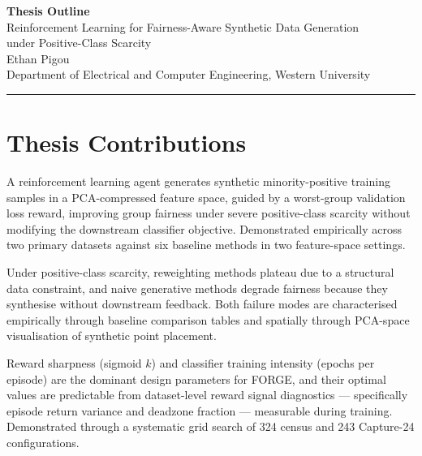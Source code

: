 \documentclass[12pt]{article}
\begin{document}
\begin{center}
    {\LARGE\bfseries Thesis Outline}\\[0.5em]
    {\large Reinforcement Learning for Fairness-Aware Synthetic Data Generation\\
    under Positive-Class Scarcity}\\[0.5em]
    {\normalsize Ethan Pigou\\
    Department of Electrical and Computer Engineering, Western University}
\end{center}

\vspace{1em}
\hrule
\vspace{1em}

\section*{Thesis Contributions}

\begin{description}[leftmargin=2.5cm, labelwidth=2cm]

    \item[\textbf{C1 --- FORGE method.}]
    A reinforcement learning agent generates synthetic minority-positive
    training samples in a PCA-compressed feature space, guided by a
    worst-group validation loss reward, improving group fairness under severe
    positive-class scarcity without modifying the downstream classifier
    objective. Demonstrated empirically across two primary datasets against six
    baseline methods in two feature-space settings.

    \item[\textbf{C2 --- Failure mode characterisation.}]
    Under positive-class scarcity, reweighting methods plateau due to a
    structural data constraint, and naive generative methods degrade fairness
    because they synthesise without downstream feedback. Both failure modes are
    characterised empirically through baseline comparison tables and spatially
    through PCA-space visualisation of synthetic point placement.

    \item[\textbf{C3 --- Governing design choices.}]
    Reward sharpness (sigmoid $k$) and classifier training intensity (epochs
    per episode) are the dominant design parameters for FORGE, and their
    optimal values are predictable from dataset-level reward signal diagnostics
    --- specifically episode return variance and deadzone fraction ---
    measurable during training. Demonstrated through a systematic grid search
    of 324 census and 243 Capture-24 configurations.

\end{description}
\end{document}
